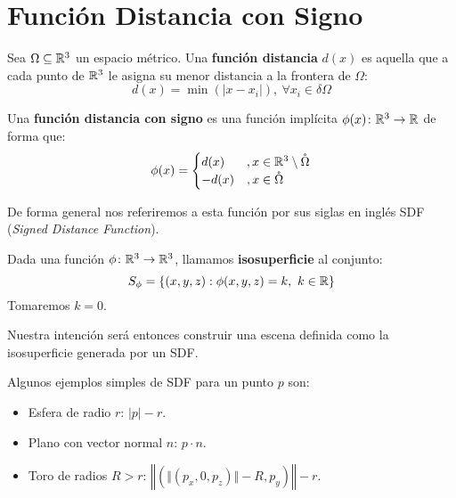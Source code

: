 
\chapter{Función Distancia con Signo}

\begin{definicion}
  Sea $\Omega \subseteq \mathbb{R}^3$ un espacio métrico. Una \textbf{función distancia} $d(x)$ es aquella que a cada punto de $\mathbb{R}^3$ le asigna su menor distancia a la frontera de $\Omega$:
  \begin{equation*}
    d(x) = \min(|x-x_i|),\ \forall x_i \in \delta\Omega
  \end{equation*}
\end{definicion}

\begin{definicion}[SDF]\label{d:sdf}
  Una \textbf{función distancia con signo} es una función implícita ${\phi(x)\colon \mathbb{R}^3 \to \mathbb{R}}$ de forma que:
  \begin{equation*}
    \phi(x) = \begin{cases}
      d(x)  & , x\in \mathbb{R}^3\setminus \mathring{\Omega} \\
      -d(x) & , x\in \mathring{\Omega}
    \end{cases}
  \end{equation*}

  De forma general nos referiremos a esta función por sus siglas en inglés SDF (\textit{Signed Distance Function}).
\end{definicion}

\begin{definicion}
  Dada una función $\phi\colon \mathbb{R}^3 \to \mathbb{R}^3$, llamamos \textbf{isosuperficie} al conjunto:
  \begin{equation*}
      S_\phi = \{(x,y,z) :  \phi(x,y,z)=k,\ k\in \mathbb{R}\}
  \end{equation*}
  Tomaremos $k=0$.
\end{definicion}

Nuestra intención será entonces construir una escena definida como la isosuperficie generada por un SDF.

\begin{ejemplo}
    Algunos ejemplos simples de SDF para un punto $p$ son:
    \begin{itemize}
        \item Esfera de radio $r$: $\vert p\vert - r$.
        \item Plano con vector normal $n$: $p\cdot n$.
        \item Toro de radios $R>r$: $\left\Vert (\Vert(p_x,0,p_z)\Vert - R, p_y) \right\Vert - r$.
    \end{itemize}
\end{ejemplo}

